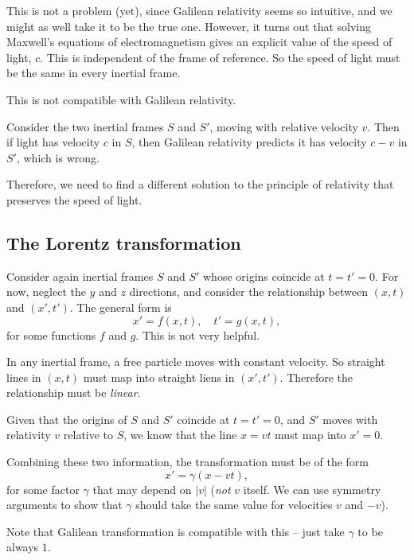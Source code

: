 \documentclass[a4paper]{article}
\begin{document}
This is not a problem (yet), since Galilean relativity seems so intuitive, and we might as well take it to be the true one. However, it turns out that solving Maxwell's equations of electromagnetism gives an explicit value of the speed of light, $c$. This is independent of the frame of reference. So the speed of light must be the same in every inertial frame.

This is not compatible with Galilean relativity.

Consider the two inertial frames $S$ and $S'$, moving with relative velocity $v$. Then if light has velocity $c$ in $S$, then Galilean relativity predicts it has velocity $c - v$ in $S'$, which is wrong.

Therefore, we need to find a different solution to the principle of relativity that preserves the speed of light.

\subsection{The Lorentz transformation}
Consider again inertial frames $S$ and $S'$ whose origins coincide at $t = t' = 0$. For now, neglect the $y$ and $z$ directions, and consider the relationship between $(x, t)$ and $(x', t')$. The general form is
\[
  x' = f(x, t),\quad t' = g(x, t),
\]
for some functions $f$ and $g$. This is not very helpful.

In any inertial frame, a free particle moves with constant velocity. So straight lines in $(x, t)$ must map into straight liens in $(x', t')$. Therefore the relationship must be \emph{linear}.

Given that the origins of $S$ and $S'$ coincide at $t = t' = 0$, and $S'$ moves with relativity $v$ relative to $S$, we know that the line $x = vt$ must map into $x'= 0$.

Combining these two information, the transformation must be of the form
\[
  x' = \gamma(x - vt),\tag{1}
\]
for some factor $\gamma$ that may depend on $|v|$ (\emph{not} $v$ itself. We can use symmetry arguments to show that $\gamma$ should take the same value for velocities $v$ and $-v$).

Note that Galilean transformation is compatible with this -- just take $\gamma$ to be always $1$.
\end{document}

